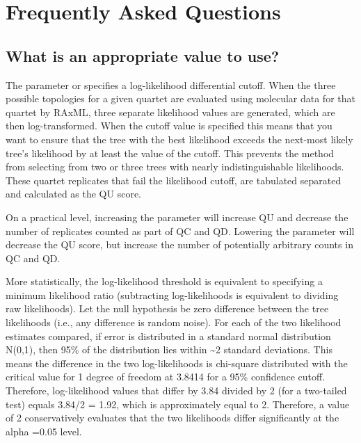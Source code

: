 \documentclass[letterpaper,12pt,english]{sphinxmanual}
\begin{document}
\chapter{Frequently Asked Questions}
\label{\detokenize{faq:faq}}\label{\detokenize{faq::doc}}\label{\detokenize{faq:frequently-asked-questions}}

\section{What is an appropriate  value to use?}
\label{\detokenize{faq:what-is-an-appropriate-l-lnlike-thresh-value-to-use}}
The parameter  or  specifies a log-likelihood differential cutoff.  When the three possible topologies for a given quartet are evaluated using molecular data for that quartet by RAxML, three separate likelihood values are generated, which are then log-transformed.  When the cutoff value is specified this means that you want to ensure that the tree with the best likelihood exceeds the next-most likely tree’s likelihood by at least the value of the cutoff.  This prevents the method from selecting from two or three trees with nearly indistinguishable likelihoods.  These quartet replicates that fail the likelihood cutoff, are tabulated separated and calculated as the QU score.

On a practical level, increasing the  parameter will increase QU and decrease the number of replicates counted as part of QC and QD.  Lowering the  parameter will decrease the QU score, but increase the number of potentially arbitrary counts in QC and QD.

More statistically, the log-likelihood threshold is equivalent to specifying a minimum likelihood ratio (subtracting log-likelihoods is equivalent to dividing raw likelihoods). Let the null hypothesis be zero difference between the tree likelihoods (i.e., any difference is random noise). For each of the two likelihood estimates compared, if error is distributed in a standard normal distribution N(0,1), then 95\% of the distribution lies within \textasciitilde{}2 standard deviations. This means the difference in the two log-likelihoods is chi-square distributed with the critical value for 1 degree of freedom at 3.8414 for a 95\% confidence cutoff.  Therefore, log-likelihood values that differ by 3.84 divided by 2 (for a two-tailed test) equals 3.84/2 = 1.92, which is approximately equal to 2.  Therefore, a  value of 2 conservatively evaluates that the two likelihoods differ significantly at the alpha =0.05 level.
\end{document}
